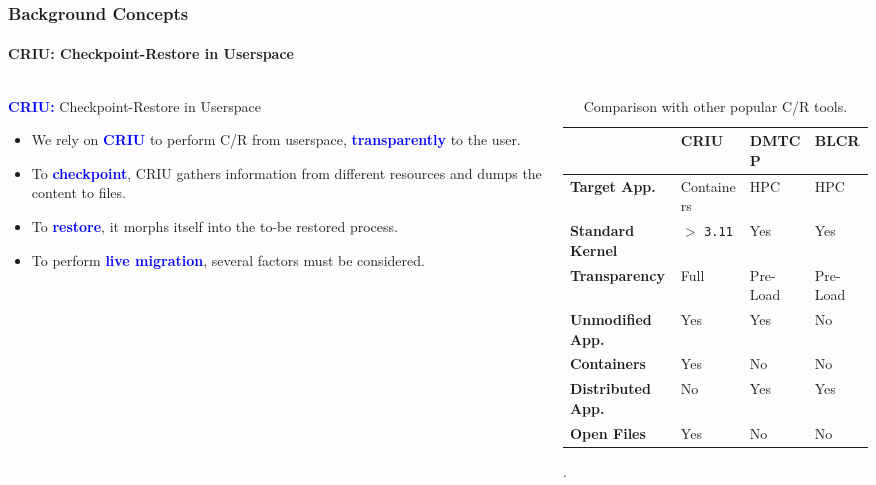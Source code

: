 \documentclass[9pt,    %
    english,            %
    xcolor=table,       %
    envcountsect,        %
    aspectratio=169     %
]{beamer}
\begin{document}
\begin{frame}
    \frametitle{Background Concepts}
    \framesubtitle{\textsc{CRIU}: Checkpoint-Restore in Userspace}

    \begin{columns}[t]
        \begin{column}{.5\textwidth}
            \textbf{\textcolor{blue}{CRIU:}} Checkpoint-Restore in Userspace 
            \begin{itemize}
                \item We rely on \textbf{\textcolor{blue}{CRIU}} to perform C/R from userspace, \textbf{\textcolor{blue}{transparently}} to the user.
                \item To \textbf{\textcolor{blue}{checkpoint}}, CRIU gathers information from different resources and dumps the content to files.
                \item To \textbf{\textcolor{blue}{restore}}, it morphs itself into the to-be restored process.
                \item To perform \textbf{\textcolor{blue}{live migration}}, several factors must be considered.
            \end{itemize}
        \end{column}
        \begin{column}{.50\textwidth}
            \begin{table}
                \centering
                {\scriptsize
                \begin{tabular}{p{1.7cm}p{1.1cm}p{1.1cm}p{1.1cm}}
                    \rowcolor{blue!50} \hline & \textbf{CRIU} & \textbf{DMTCP} & \textbf{BLCR} \\[3pt]
                    \hline \hline \textbf{Target App.} & Containers & HPC & HPC \\[3pt]
                    \textbf{Standard Kernel} & $>$ \texttt{3.11} & Yes & Yes \\[3pt]
                    \textbf{Transparency} &  Full & Pre-Load & Pre-Load \\[3pt]
                    \textbf{Unmodified App.} & Yes & Yes & No \\[3pt]
                    \textbf{Containers} & Yes & No & No \\[3pt]
                    \textbf{Distributed App.} & No & Yes & Yes \\[3pt]
                    \textbf{Open Files} & Yes & No & No \\[3pt] \hline
                \end{tabular}
                }
                \caption{Comparison with other popular C/R tools.\label{table:filter}}.
            \end{table}
        \end{column}
    \end{columns}
\end{frame}
\end{document}
